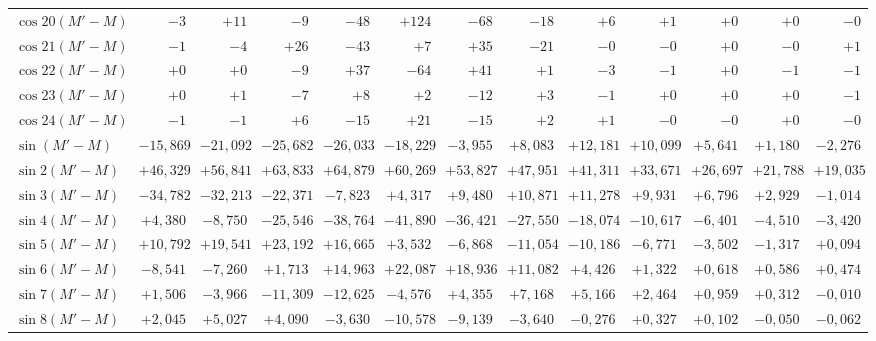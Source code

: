 \begin{landscape}
\begin{longtable}{@{}l|r|r|r|r|r|r|r|r|r|r|r|r@{}}
\(\cos 20(M'-M)\) & \(-3\) & \(+11\) & \(-9\) & \(-48\) & \(+124\) & \(-68\) & \(-18\) & \(+6\) & \(+1\) & \(+0\) & \(+0\) & \(-0\)\\
\(\cos 21(M'-M)\) & \(-1\) & \(-4\) & \(+26\) & \(-43\) & \(+7\) & \(+35\) & \(-21\) & \(-0\) & \(-0\) & \(+0\) & \(-0\) & \(+1\)\\
\(\cos 22(M'-M)\) & \(+0\) & \(+0\) & \(-9\) & \(+37\) & \(-64\) & \(+41\) & \(+1\) & \(-3\) & \(-1\) & \(+0\) & \(-1\) & \(-1\)\\
\(\cos 23(M'-M)\) & \(+0\) & \(+1\) & \(-7\) & \(+8\) & \(+2\) & \(-12\) & \(+3\) & \(-1\) & \(+0\) & \(+0\) & \(+0\) & \(-1\)\\
\(\cos 24(M'-M)\) & \(-1\) & \(-1\) & \(+6\) & \(-15\) & \(+21\) & \(-15\) & \(+2\) & \(+1\) & \(-0\) & \(-0\) & \(+0\) & \(-0\)\\[6pt]
\(\sin(M'-M)\) & \(-15{,}869\) & \(-21{,}092\) & \(-25{,}682\) & \(-26{,}033\) & \(-18{,}229\) & \(-3{,}955\) & \(+8{,}083\) & \(+12{,}181\) & \(+10{,}099\) & \(+5{,}641\) & \(+1{,}180\) & \(-2{,}276\)\\
\(\sin 2(M'-M)\) & \(+46{,}329\) & \(+56{,}841\) & \(+63{,}833\) & \(+64{,}879\) & \(+60{,}269\) & \(+53{,}827\) & \(+47{,}951\) & \(+41{,}311\) & \(+33{,}671\) & \(+26{,}697\) & \(+21{,}788\) & \(+19{,}035\)\\
\(\sin 3(M'-M)\) & \(-34{,}782\) & \(-32{,}213\) & \(-22{,}371\) & \(-7{,}823\) & \(+4{,}317\) & \(+9{,}480\) & \(+10{,}871\) & \(+11{,}278\) & \(+9{,}931\) & \(+6{,}796\) & \(+2{,}929\) & \(-1{,}014\)\\
\(\sin 4(M'-M)\) & \(+4{,}380\) & \(-8{,}750\) & \(-25{,}546\) & \(-38{,}764\) & \(-41{,}890\) & \(-36{,}421\) & \(-27{,}550\) & \(-18{,}074\) & \(-10{,}617\) & \(-6{,}401\) & \(-4{,}510\) & \(-3{,}420\)\\
\(\sin 5(M'-M)\) & \(+10{,}792\) & \(+19{,}541\) & \(+23{,}192\) & \(+16{,}665\) & \(+3{,}532\) & \(-6{,}868\) & \(-11{,}054\) & \(-10{,}186\) & \(-6{,}771\) & \(-3{,}502\) & \(-1{,}317\) & \(+0{,}094\)\\
\(\sin 6(M'-M)\) & \(-8{,}541\) & \(-7{,}260\) & \(+1{,}713\) & \(+14{,}963\) & \(+22{,}087\) & \(+18{,}936\) & \(+11{,}082\) & \(+4{,}426\) & \(+1{,}322\) & \(+0{,}618\) & \(+0{,}586\) & \(+0{,}474\)\\
\(\sin 7(M'-M)\) & \(+1{,}506\) & \(-3{,}966\) & \(-11{,}309\) & \(-12{,}625\) & \(-4{,}576\) & \(+4{,}355\) & \(+7{,}168\) & \(+5{,}166\) & \(+2{,}464\) & \(+0{,}959\) & \(+0{,}312\) & \(-0{,}010\)\\
\(\sin 8(M'-M)\) & \(+2{,}045\) & \(+5{,}027\) & \(+4{,}090\) & \(-3{,}630\) & \(-10{,}578\) & \(-9{,}139\) & \(-3{,}640\) & \(-0{,}276\) & \(+0{,}327\) & \(+0{,}102\) & \(-0{,}050\) & \(-0{,}062\)\\

\end{longtable}
\end{landscape}
